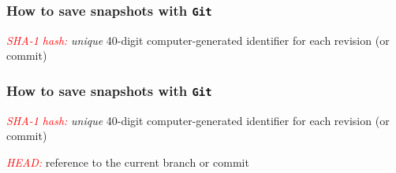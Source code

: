 \documentclass{beamer}
\begin{document}
\begin{frame}
\frametitle{How to save snapshots with \texttt{Git}}
\textit{\textcolor{red}{SHA-1 hash:}} \textit{unique} 40-digit computer-generated identifier for each revision (or commit)
\begin{center}
\end{center}
\end{frame}

\begin{frame}
\frametitle{How to save snapshots with \texttt{Git}}
\textit{\textcolor{red}{SHA-1 hash:}} \textit{unique} 40-digit computer-generated identifier for each revision (or commit)

\textit{\textcolor{red}{HEAD:}} reference to the current branch or commit
\begin{center}
\end{center}
\end{frame}
\end{document}
